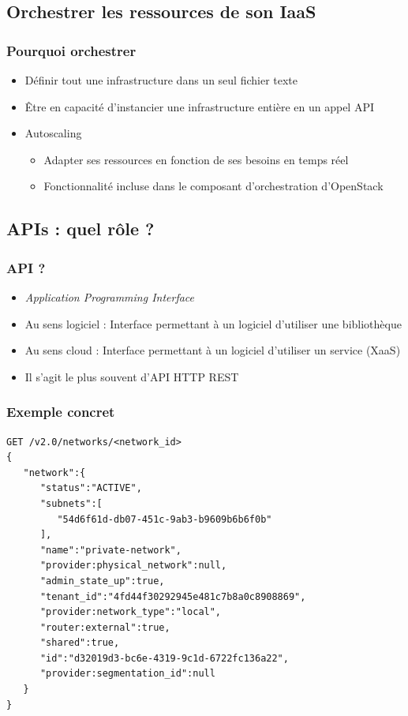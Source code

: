   \subsection[Orchestration]{Orchestrer les ressources de son IaaS}

  \begin{frame}
    \frametitle{Pourquoi orchestrer}
    \begin{itemize}
      \item Définir tout une infrastructure dans un seul fichier texte
      \item Être en capacité d'instancier une infrastructure entière en un appel API
      \item Autoscaling
      \begin{itemize}
        \item Adapter ses ressources en fonction de ses besoins en temps réel
        \item Fonctionnalité incluse dans le composant d'orchestration d'OpenStack
      \end{itemize}
    \end{itemize}
  \end{frame}

  \subsection[APIs]{APIs : quel rôle ?}

  \begin{frame}
    \frametitle{API ?}
    \begin{itemize}
      \item \textit{Application Programming Interface}
      \item Au sens logiciel : Interface permettant à un logiciel d'utiliser une bibliothèque
      \item Au sens cloud : Interface permettant à un logiciel d'utiliser un service (XaaS)
      \item Il s'agit le plus souvent d'API HTTP REST
    \end{itemize}
  \end{frame}

  \begin{frame}[containsverbatim]
    \frametitle{Exemple concret}
\begin{verbatim}
GET /v2.0/networks/<network_id>
{
   "network":{
      "status":"ACTIVE",
      "subnets":[
         "54d6f61d-db07-451c-9ab3-b9609b6b6f0b"
      ],
      "name":"private-network",
      "provider:physical_network":null,
      "admin_state_up":true,
      "tenant_id":"4fd44f30292945e481c7b8a0c8908869",
      "provider:network_type":"local",
      "router:external":true,
      "shared":true,
      "id":"d32019d3-bc6e-4319-9c1d-6722fc136a22",
      "provider:segmentation_id":null
   }
}
\end{verbatim}
  \end{frame}

